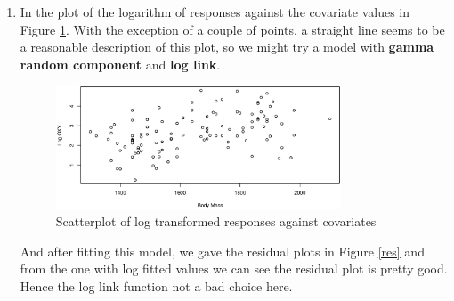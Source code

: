 \documentclass{article}
\begin{document}
\begin{enumerate}[leftmargin = 0 em, label = 3.\arabic*., font = \bfseries]
\begin{enumerate}[label = \arabic*.]
		 \newpage
		 \item 
		 In the plot of the logarithm of responses against the covariate values in Figure \ref{link}. With the exception of a couple of points, a straight line seems to be a reasonable description of this plot, so we might try a model with \textbf{gamma random component} and \textbf{log link}. 
		 \begin{figure}[!htb]
		 	\centering
		 	\includegraphics[width = 0.8\textwidth]{Find_Link.eps}
		 	\caption{Scatterplot of log transformed responses against covariates}
		 	\label{link}
		 \end{figure}

		 And after fitting this model, we gave the residual plots in Figure \ref{res} and from the one with log fitted values we can see the residual plot is pretty good. Hence the log link function not a bad choice here. 


\end{enumerate}
\end{enumerate}
\end{document}
